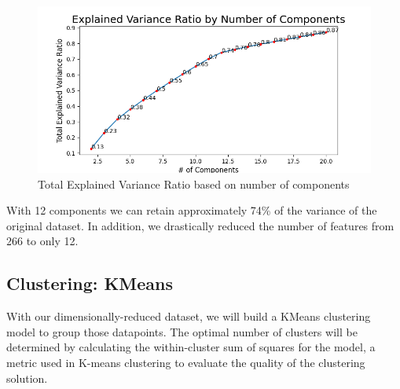 \documentclass[12pt]{article}
\begin{document}
\begin{figure}[h]
    \centering
    \includegraphics[width=\textwidth]{images/explained_variance_ratio.png}
    \caption{Total Explained Variance Ratio based on number of components}
    \label{fig:my_label}
\end{figure}
With 12 components we can retain approximately 74\% of the variance of the original dataset. In addition, we drastically reduced the number of features from 266 to only 12.

\newpage
\subsection{Clustering: KMeans}
With our dimensionally-reduced dataset, we will build a KMeans clustering model to group those datapoints. The optimal number of clusters will be determined by calculating the within-cluster sum of squares for the model, a metric used in K-means clustering to evaluate the quality of the clustering solution.
\end{document}
